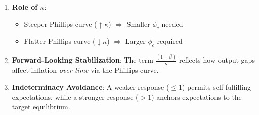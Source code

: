 \documentclass{article}
\begin{document}
\begin{itemize}
\begin{intuitionbox}
\begin{enumerate}
    \item \textbf{Role of $\kappa$}:
    \begin{itemize}
        \item Steeper Phillips curve ($\uparrow \kappa$) $\Rightarrow$ Smaller $\phi_c$ needed
        \item Flatter Phillips curve ($\downarrow \kappa$) $\Rightarrow$ Larger $\phi_c$ required
    \end{itemize}
    
    \item \textbf{Forward-Looking Stabilization}: The term $\frac{(1-\beta)}{\kappa}$ reflects how output gaps affect inflation \textit{over time} via the Phillips curve.
    
    \item \textbf{Indeterminacy Avoidance}: A weaker response ($\leq 1$) permits self-fulfilling expectations, while a stronger response ($>1$) anchors expectations to the target equilibrium.
\end{enumerate}
    \end{intuitionbox}
\end{itemize}
\end{document}
